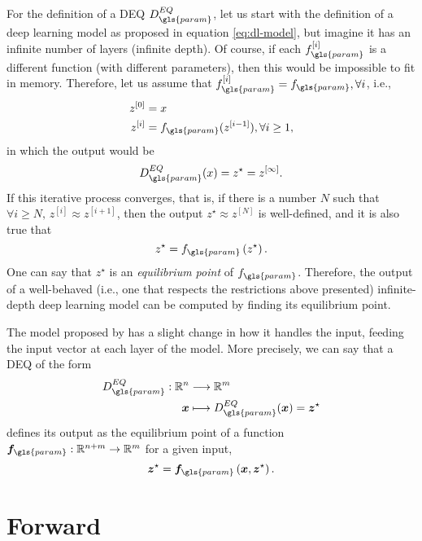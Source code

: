 For the definition of a \gls{DEQ} $D^{EQ}_{\gls{param}}$, let us start with the definition of a deep learning model as proposed in equation \eqref{eq:dl-model}, but imagine it has an infinite number of layers (infinite depth).
Of course, if each $f^{[i]}_{\gls{param}}$ is a different function (with different parameters), then this would be impossible to fit in memory.
Therefore, let us assume that $f_{\gls{param}}^{[i]}=f_{\gls{param}},\forall i$, i.e.,
\begin{equation*}
\begin{split}
    z^{[0]} &= x \\
    z^{[i]} &= f_{\gls{param}}(z^{[i-1]}), \forall i\ge 1
,\end{split}
\end{equation*}
in which the output would be \[
D_{\gls{param}}^{EQ}(x) = z^{\star} = z^{[\infty]}
.\]
If this iterative process converges, that is, if there is a number $N$ such that $\forall i\ge N,\,z^{[i]}\approx z^{[i+1]}$, then the output $z^{\star}\approx z^{[N]}$ is well-defined, and it is also true that  \[
    z^{\star} = f_{\gls{param}}\left( z^{\star} \right) 
.\] 
One can say that $z^{\star}$ is an \emph{equilibrium point} of $f_{\gls{param}}$.
Therefore, the output of a well-behaved (i.e., one that respects the restrictions above presented) infinite-depth deep learning model can be computed by finding its equilibrium point.

The model proposed by \textcite{Bai2019} has a slight change in how it handles the input, feeding the input vector at each layer of the model. More precisely, we can say that a \gls{DEQ} of the form
\begin{align*}
    D^{EQ}_{\gls{param}}: \R^{n} &\longrightarrow \R^{m} \\
    \bm{x} &\longmapsto D^{EQ}_{\gls{param}}(\bm{x}) = \bm{z}^{\star}
\end{align*}
defines its output as the equilibrium point of a function $\bm{f}_{\gls{param}}:\R^{n+m}\to \R^{m}$ for a given input, 
\begin{equation}\label{eq:z-star}
    \bm{z}^{\star} = \bm{f}_{\gls{param}}\left( \bm{x},\bm{z}^{\star} \right) 
.\end{equation}

\section{Forward}

